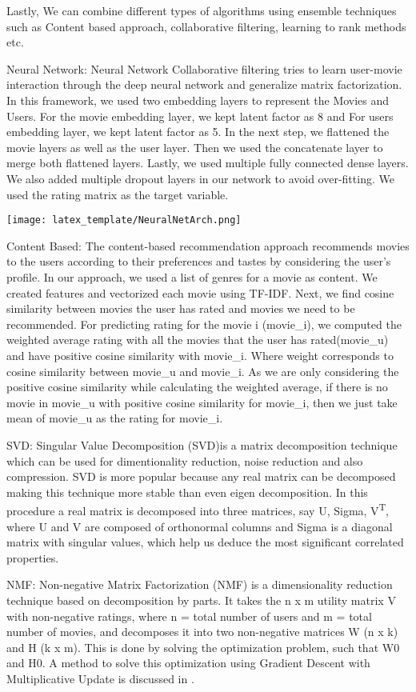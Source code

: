 \documentclass[sigconf]{acmart}
\newcommand{\minimize}{\operatornamewithlimits{minimize}}
\begin{document}
 Lastly, We can combine different types of algorithms using ensemble techniques such as Content based approach, collaborative filtering, learning to rank methods etc.

Neural Network: Neural Network Collaborative filtering tries to learn user-movie interaction through the deep neural network and generalize matrix factorization. In this framework, we used two embedding layers to represent the Movies and Users. For the movie embedding layer, we kept latent factor as 8 and For users embedding layer, we kept latent factor as 5. In the next step, we flattened the movie layers as well as the user layer. Then we used the concatenate layer to merge both flattened layers.  Lastly, we used multiple fully connected dense layers. We also added multiple dropout layers in our network to avoid over-fitting. We used the rating matrix as the target variable.


\texttt{[image: latex\_template/NeuralNetArch.png]}

Content Based: The content-based recommendation approach recommends movies to the users according to their preferences and tastes by considering the user's profile. In our approach, we used a list of genres for a movie as content. We created features and vectorized each movie using TF-IDF. Next, we find cosine similarity between movies the user has rated and movies we need to be recommended. For predicting rating for the movie i (movie\_i), we computed the weighted average rating with all the movies that the user has rated(movie\_u) and have positive cosine similarity with movie\_i. Where weight corresponds to cosine similarity between movie\_u and movie\_i. As we are only considering the positive cosine similarity while calculating the weighted average, if there is no movie in movie\_u with positive cosine similarity for movie\_i, then we just take mean of movie\_u as the rating for movie\_i.

SVD: Singular Value Decomposition (SVD)is a matrix decomposition technique which can be used for dimentionality reduction, noise reduction and also compression. SVD is more popular because any real matrix can be decomposed making this technique more stable than even eigen decomposition. In this procedure a real matrix is decomposed into three matrices, say U, Sigma, V{\textsuperscript{T}}, where U and V are composed of orthonormal columns and Sigma is a diagonal matrix with singular values, which help us deduce the most significant correlated properties.

NMF: Non-negative Matrix Factorization (NMF)\cite{nmfwiki} is a dimensionality reduction technique based on decomposition by parts. It takes the n x m utility matrix V with non-negative ratings, where n = total number of users and m = total number of movies, and decomposes it into two non-negative matrices W (n x k) and H (k x m). This is done by solving the optimization problem, \beginmath{} \minimize {\|V - WH\|} \endmath{} such that W\beginmath{}{\geq}\endmath{}0 and H\beginmath{}{\geq}\endmath{}0. A method to solve this optimization using Gradient Descent with Multiplicative Update is discussed in \cite{NIPS2000_1861}.
\end{document}

